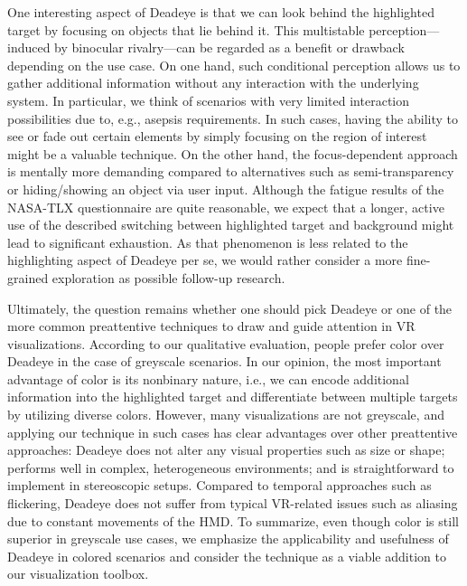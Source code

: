\documentclass[journal]{vgtc}                %
\begin{document}
One interesting aspect of Deadeye is that we can look behind the highlighted target by focusing on objects that lie behind it. This multistable perception---induced by binocular rivalry---can be regarded as a benefit or drawback depending on the use case. On one hand, such conditional perception allows us to gather additional information without any interaction with the underlying system. In particular, we think of scenarios with very limited interaction possibilities due to, e.g., asepsis requirements. In such cases, having the ability to see or fade out certain elements by simply focusing on the region of interest might be a valuable technique. On the other hand, the focus-dependent approach is mentally more demanding compared to alternatives such as semi-transparency or hiding/showing an object via user input. Although the fatigue results of the NASA-TLX questionnaire are quite reasonable, we expect that a longer, active use of the described switching between highlighted target and background might lead to significant exhaustion. As that phenomenon is less related to the highlighting aspect of Deadeye per se, we would rather consider a more fine-grained exploration as possible follow-up research.  

Ultimately, the question remains whether one should pick Deadeye or one of the more common preattentive techniques to draw and guide attention in VR visualizations. According to our qualitative evaluation, people prefer color over Deadeye in the case of greyscale scenarios. In our opinion, the most important advantage of color is its nonbinary nature, i.e., we can encode additional information into the highlighted target and differentiate between multiple targets by utilizing diverse colors. However, many visualizations are not greyscale, and applying our technique in such cases has clear advantages over other preattentive approaches: Deadeye does not alter any visual properties such as size or shape; performs well in complex, heterogeneous environments; and is straightforward to implement in stereoscopic setups. Compared to temporal approaches such as flickering, Deadeye does not suffer from typical VR-related issues such as aliasing due to constant movements of the HMD. To summarize, even though color is still superior in greyscale use cases, we emphasize the applicability and usefulness of Deadeye in colored scenarios and consider the technique as a viable addition to our visualization toolbox.
\end{document}
